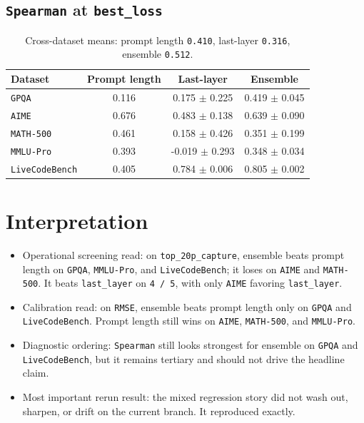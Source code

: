 \documentclass[11pt]{article}
\begin{document}
\subsection*{\texttt{Spearman} at \texttt{best\_loss}}

\begin{table}[h]
\centering
\small
\begin{tabular}{lccc}
\toprule
Dataset & Prompt length & Last-layer & Ensemble \\
\midrule
\texttt{GPQA} & 0.116 & 0.175 $\pm$ 0.225 & 0.419 $\pm$ 0.045 \\
\texttt{AIME} & 0.676 & 0.483 $\pm$ 0.138 & 0.639 $\pm$ 0.090 \\
\texttt{MATH-500} & 0.461 & 0.158 $\pm$ 0.426 & 0.351 $\pm$ 0.199 \\
\texttt{MMLU-Pro} & 0.393 & -0.019 $\pm$ 0.293 & 0.348 $\pm$ 0.034 \\
\texttt{LiveCodeBench} & 0.405 & 0.784 $\pm$ 0.006 & 0.805 $\pm$ 0.002 \\
\bottomrule
\end{tabular}
\caption{Cross-dataset means: prompt length \texttt{0.410}, last-layer \texttt{0.316}, ensemble \texttt{0.512}.}
\end{table}

\section{Interpretation}

\begin{itemize}
\item Operational screening read:
  on \texttt{top\_20p\_capture}, ensemble beats prompt length on
  \texttt{GPQA}, \texttt{MMLU-Pro}, and \texttt{LiveCodeBench}; it loses on
  \texttt{AIME} and \texttt{MATH-500}. It beats \texttt{last\_layer} on
  \texttt{4 / 5}, with only \texttt{AIME} favoring \texttt{last\_layer}.
\item Calibration read:
  on \texttt{RMSE}, ensemble beats prompt length only on \texttt{GPQA} and
  \texttt{LiveCodeBench}. Prompt length still wins on \texttt{AIME},
  \texttt{MATH-500}, and \texttt{MMLU-Pro}.
\item Diagnostic ordering:
  \texttt{Spearman} still looks strongest for ensemble on
  \texttt{GPQA} and \texttt{LiveCodeBench}, but it remains tertiary and should
  not drive the headline claim.
\item Most important rerun result:
  the mixed regression story did not wash out, sharpen, or drift on the current
  branch. It reproduced exactly.
\end{itemize}
\end{document}
